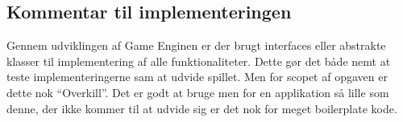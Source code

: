 



\subsection{Kommentar til implementeringen}

Gennem udviklingen af Game Enginen er der brugt interfaces eller abstrakte 
klasser til implementering af alle funktionaliteter. Dette gør det både nemt
at teste implementeringerne sam at udvide spillet. Men for scopet af opgaven
er dette nok ``Overkill''. Det er godt at bruge men for en applikation så 
lille som denne, der ikke kommer til at udvide sig er det nok for meget 
boilerplate kode. 




